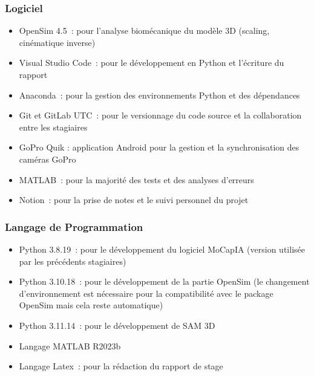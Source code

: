             \subsubsection{Logiciel}
                \begin{itemize}
                    \item OpenSim 4.5 : pour l'analyse biomécanique du modèle 3D (scaling, cinématique inverse)
                    \item Visual Studio Code : pour le développement en Python et l'écriture du rapport
                    \item Anaconda : pour la gestion des environnements Python et des dépendances
                    \item Git et GitLab UTC : pour le versionnage du code source et la collaboration entre les stagiaires
                    \item GoPro Quik : application Android pour la gestion et la synchronisation des caméras GoPro
                    \item MATLAB : pour la majorité des tests et des analyses d'erreurs
                    \item Notion : pour la prise de notes et le suivi personnel du projet
                \end{itemize}

            \subsubsection{Langage de Programmation}
                \begin{itemize}
                    \item Python 3.8.19 : pour le développement du logiciel MoCapIA (version utilisée par les précédents stagiaires)
                    \item Python 3.10.18 : pour le développement de la partie OpenSim (le changement d'environnement est nécessaire pour la compatibilité avec le package OpenSim mais cela reste automatique)
                    \item Python 3.11.14 : pour le développement de SAM 3D
                    \item Langage MATLAB R2023b
                    \item Langage Latex : pour la rédaction du rapport de stage
                \end{itemize}

